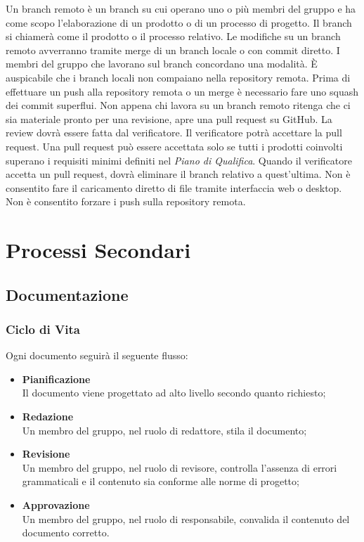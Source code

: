 \documentclass[a4paper, 12pt]{article}
\begin{document}
Un branch remoto è un branch su cui operano uno o più membri del gruppo e ha come scopo l'elaborazione di un prodotto o di un processo di progetto. Il branch si chiamerà come il prodotto o il processo relativo.\newline
Le modifiche su un branch remoto avverranno tramite merge di un branch locale o con commit diretto. I membri del gruppo che lavorano sul branch concordano una modalità.\newline
È auspicabile che i branch locali non compaiano nella repository remota.\newline
Prima di effettuare un push alla repository remota o un merge è necessario fare uno squash dei commit superflui.\newline
Non appena chi lavora su un branch remoto ritenga che ci sia materiale pronto per una revisione, apre una pull request su GitHub.\newline
La review dovrà essere fatta dal verificatore. Il verificatore potrà accettare la pull request.\newline
Una pull request può essere accettata solo se tutti i prodotti coinvolti superano i requisiti minimi definiti nel \textit{Piano di Qualifica}.\newline
Quando il verificatore accetta un pull request, dovrà eliminare il branch relativo a quest'ultima.\newline
Non è consentito fare il caricamento diretto di file tramite interfaccia web o desktop.\newline
Non è consentito forzare i push sulla repository remota.\newline


\newpage

\section{Processi Secondari}
\subsection{Documentazione}
\subsubsection{Ciclo di Vita}
Ogni documento seguirà il seguente flusso:
\begin{itemize}
    \item \textbf{Pianificazione} \\ Il documento viene progettato ad alto livello secondo quanto richiesto;
    \item \textbf{Redazione} \\ Un membro del gruppo, nel ruolo di redattore, stila il documento;
    \item \textbf{Revisione} \\ Un membro del gruppo, nel ruolo di revisore, controlla l'assenza di errori grammaticali e il contenuto sia conforme alle norme di progetto;
    \item \textbf{Approvazione} \\ Un membro del gruppo, nel ruolo di responsabile, convalida il contenuto del documento corretto.
\end{itemize}
\end{document}
